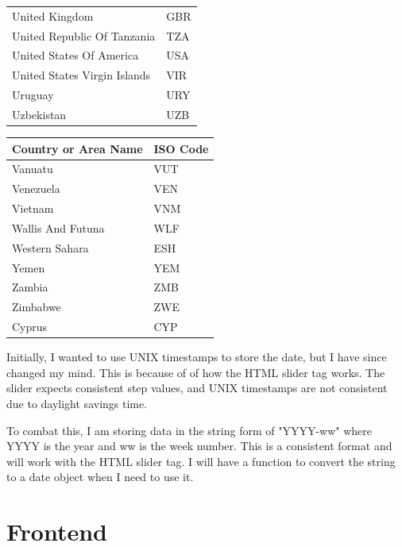 \documentclass{report}
\begin{document}
\begin{center}
\begin{minipage}{0.46\textwidth}
\begin{tabular}{|p{10.5em}|p{6em}|}
            United Kingdom & GBR\\
            United Republic Of Tanzania & TZA\\
            United States Of America & USA\\
            United States Virgin Islands & VIR\\
            Uruguay & URY\\
            Uzbekistan & UZB\\
            \hline
        \end{tabular}
    \end{minipage}
    \hfill
    \begin{minipage}{0.46\textwidth}
        \begin{tabular}{|p{10.5em}|p{6em}|}
            \hline
            Country or Area Name & ISO Code\\
            \hline
            Vanuatu & VUT\\
            Venezuela & VEN\\
            Vietnam & VNM\\
            Wallis And Futuna & WLF\\
            Western Sahara & ESH\\
            Yemen & YEM\\
            Zambia & ZMB\\
            Zimbabwe & ZWE\\
            Cyprus & CYP\\
            \hline
        \end{tabular}
    \end{minipage}
\end{center}

\newpage

Initially, I wanted to use UNIX timestamps to store the date, but I have since changed my mind. This is because of of how the HTML slider tag works. The slider expects consistent step values, and UNIX timestamps are not consistent due to daylight savings time.

To combat this, I am storing data in the string form of "YYYY-ww" where YYYY is the year and ww is the week number. This is a consistent format and will work with the HTML slider tag. I will have a function to convert the string to a date object when I need to use it.

\section{Frontend}
\end{document}
